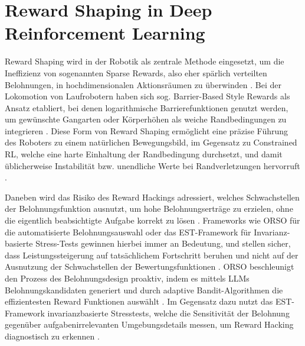 \section{Reward Shaping in Deep Reinforcement Learning} %
Reward Shaping wird in der Robotik als zentrale Methode eingesetzt, um die Ineffizienz von sogenannten Sparse Rewards, also eher spärlich verteilten Belohnungen, in hochdimensionalen Aktionsräumen zu überwinden \cite{burda2018explorationrandomnetworkdistillation}. \newline 
Bei der Lokomotion von Laufrobotern haben sich sog. Barrier-Based Style Rewards als Ansatz etabliert, bei denen logarithmische Barrierefunktionen genutzt werden, um gewünschte Gangarten oder Körperhöhen als weiche Randbedingungen zu integrieren \cite{kimLearningFrameworkDiverse2025}. Diese Form von Reward Shaping ermöglicht eine präzise Führung des Roboters zu einem natürlichen Bewegungsbild, im Gegensatz zu Constrained RL, welche eine harte Einhaltung der Randbedingung durchsetzt, und damit üblicherweise Instabilität bzw. unendliche Werte bei Randverletzungen hervorruft \cite{kimLearningFrameworkDiverse2025}.

Daneben wird das Risiko des Reward Hackings adressiert, welches Schwachstellen der Belohnungsfunktion ausnutzt, um hohe Belohnungserträge zu erzielen, ohne die eigentlich beabsichtigte Aufgabe korrekt zu lösen \cite{skalseDefiningCharacterizingReward2025}. Frameworks wie ORSO für die automatisierte Belohnungsauswahl \cite{zhangORSOAcceleratingReward2025} oder das EST-Framework für Invarianz-basierte Stress-Tests \cite{shihabDetectingProxyGaming2026} gewinnen hierbei immer an Bedeutung, und stellen sicher, dass Leistungssteigerung auf tatsächlichem Fortschritt beruhen und nicht auf der Ausnutzung der Schwachstellen der Bewertungsfunktionen \cite{zhangORSOAcceleratingReward2025}. \newline
ORSO beschleunigt den Prozess des Belohnungsdesign proaktiv, indem es mittels LLMs Belohnungskandidaten generiert und durch adaptive Bandit-Algorithmen die effizientesten Reward Funktionen auswählt \cite{zhangORSOAcceleratingReward2025}. Im Gegensatz dazu nutzt das EST-Framework invarianzbasierte Stresstests, welche die Sensitivität der Belohnung gegenüber aufgabenirrelevanten Umgebungsdetails messen, um Reward Hacking diagnostisch zu erkennen \cite{shihabDetectingProxyGaming2026}. %

